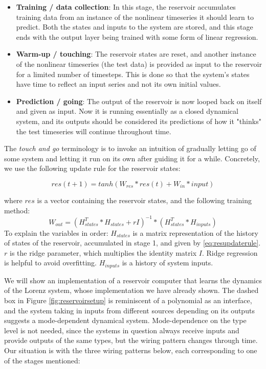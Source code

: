 \begin{itemize}
    \item \textbf{Training / data collection}: In this stage, the reservoir accumulates training data from an instance of the nonlinear timeseries it should learn to predict. Both the states and inputs to the system are stored, and this stage ends with the output layer being trained with some form of linear regression.
    \item \textbf{Warm-up / touching}: The reservoir states are reset, and another instance of the nonlinear timeseries (the test data) is provided as input to the reservoir for a limited number of timesteps. This is done so that the system's states have time to reflect an input series and not its own initial values.
    \item \textbf{Prediction / going}: The output of the reservoir is now looped back on itself and given as input. Now it is running essentially as a closed dynamical system, and its outputs should be considered its predictions of how it "thinks" the test timeseries will continue throughout time.
\end{itemize}

The \textit{touch and go} terminology is to invoke an intuition of gradually letting go of some system and letting it run on its own after guiding it for a while. Concretely, we use the following update rule for the reservoir states:

\begin{equation}
res(t + 1) = tanh(W_{res} * res(t) + W_{in}*input)
\label{eq:resupdaterule}
\end{equation}

where $res$ is a vector containing the reservoir states, and the following training method:
\begin{equation}
W_{out} = (H_{states}^T * H_{states} + rI)^{-1} * (H_{states}^T * H_{inputs})
\end{equation}
To explain the variables in order: $H_{states}$ is a matrix representation of the history of states of the reservoir, accumulated in stage 1, and given by \ref{eq:resupdaterule}. $r$ is the ridge parameter, which multiplies the identity matrix $I$. Ridge regression is helpful to avoid overfitting. $H_{inputs}$ is a history of system inputs.


We will show an implementation of a reservoir computer that learns the dynamics of the Lorenz system, whose implementation we have already shown. The dashed box in Figure \ref{fig:reservoirsetup} is reminiscent of a polynomial as an interface, and the system taking in inputs from different sources depending on its outputs suggests a mode-dependent dynamical system. Mode-dependence on the type level is not needed, since the systems in question always receive inputs and provide outputs of the same types, but the wiring pattern changes through time. Our situation is with the three wiring patterns below, each corresponding to one of the stages mentioned:


